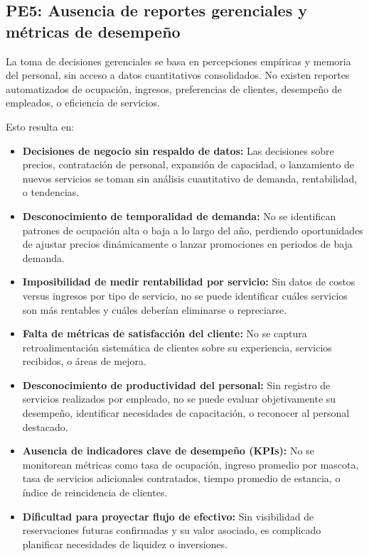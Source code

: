 \subsection{PE5: Ausencia de reportes gerenciales y métricas de desempeño}
\label{sec:pe5}

	La toma de decisiones gerenciales se basa en percepciones empíricas y memoria del personal, sin acceso a datos cuantitativos consolidados. No existen reportes automatizados de ocupación, ingresos, preferencias de clientes, desempeño de empleados, o eficiencia de servicios.
	
	Esto resulta en:
	
	\begin{itemize}
		\item \textbf{Decisiones de negocio sin respaldo de datos:} Las decisiones sobre precios, contratación de personal, expansión de capacidad, o lanzamiento de nuevos servicios se toman sin análisis cuantitativo de demanda, rentabilidad, o tendencias.
		
		\item \textbf{Desconocimiento de temporalidad de demanda:} No se identifican patrones de ocupación alta o baja a lo largo del año, perdiendo oportunidades de ajustar precios dinámicamente o lanzar promociones en periodos de baja demanda.
		
		\item \textbf{Imposibilidad de medir rentabilidad por servicio:} Sin datos de costos versus ingresos por tipo de servicio, no se puede identificar cuáles servicios son más rentables y cuáles deberían eliminarse o repreciarse.
		
		\item \textbf{Falta de métricas de satisfacción del cliente:} No se captura retroalimentación sistemática de clientes sobre su experiencia, servicios recibidos, o áreas de mejora.
		
		\item \textbf{Desconocimiento de productividad del personal:} Sin registro de servicios realizados por empleado, no se puede evaluar objetivamente su desempeño, identificar necesidades de capacitación, o reconocer al personal destacado.
		
		\item \textbf{Ausencia de indicadores clave de desempeño (KPIs):} No se monitorean métricas como tasa de ocupación, ingreso promedio por mascota, tasa de servicios adicionales contratados, tiempo promedio de estancia, o índice de reincidencia de clientes.
		
		\item \textbf{Dificultad para proyectar flujo de efectivo:} Sin visibilidad de reservaciones futuras confirmadas y su valor asociado, es complicado planificar necesidades de liquidez o inversiones.
	\end{itemize}

